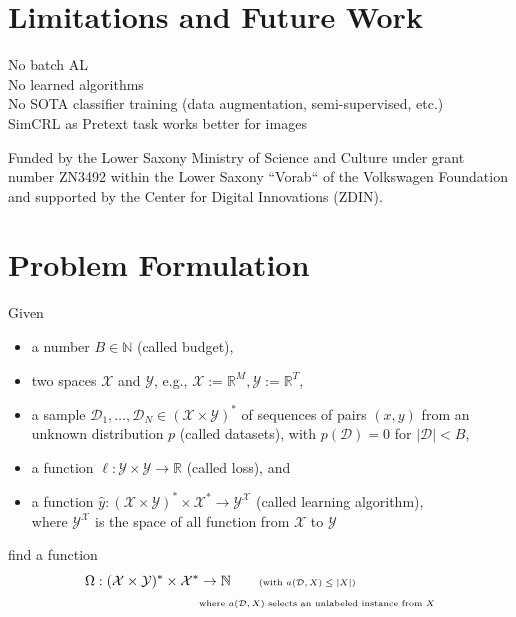 \documentclass[]{article}
\newcommand{\R}{\mathbb{R}}
\newcommand{\N}{\mathbb{N}}
\newcommand{\D}{\mathcal{D}}
\newcommand{\X}{\mathcal{X}}
\newcommand{\Y}{\mathcal{Y}}
\begin{document}
\section{Limitations and Future Work}
No batch AL \\
No learned algorithms \\
No SOTA classifier training (data augmentation, semi-supervised, etc.) \\
SimCRL as Pretext task works better for images

\newpage

\begin{ack}
	Funded by the Lower Saxony Ministry of Science and Culture under grant number ZN3492 within the Lower Saxony “Vorab“ of the Volkswagen Foundation and supported by the Center for Digital Innovations (ZDIN).
\end{ack}


 

\appendix

\section{Problem Formulation}\label{app:problem_formulation}
Given
\begin{itemize}
	\item a number $B\in\N$ (called budget),
	\item two spaces $\X$ and $\Y$,  {\tiny e.g., $\X:=\R^M, \Y:=\R^T$},
	\item a sample $\D_1,\ldots,\D_N \in (\X\times \Y)^*$ of
	sequences of pairs $(x,y)$  from an unknown distribution $p$
	(called datasets),
	{\tiny with $p(\D)=0$ for $|\D|<B$,}
	\item a function $\ell:\Y\times\Y\rightarrow\R$ (called loss), and
	\item a function $\hat y:  (\X\times \Y)^* \times \X^* \rightarrow \Y^\X$
	(called learning algorithm), \\
	{\tiny where $\Y^\X$ is the space of all function from $\X$ to $\Y$}
\end{itemize}
find a function
\vspace*{-0.5cm}
\begin{align*}
	\Omega: (\X\times \Y)^* \times \X^* &\rightarrow \N
	\quad\quad \text{\tiny (with $a(\D,X) \leq |X|$)} \\
	& \text{\tiny where $a(\D,X)$ selects an unlabeled instance from $X$}
\end{align*}
\end{document}
